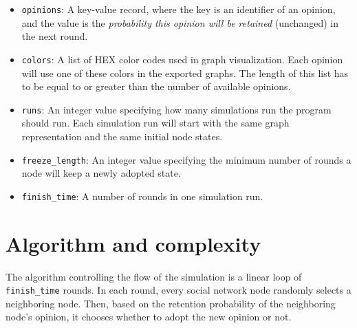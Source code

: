 \documentclass[11pt]{article}
\begin{document}
\begin{itemize}
	\setlength\itemsep{0.2em}

	\item \verb|opinions|: A key-value record, where the key is an identifier of an opinion, and the value is the \emph{probability this opinion will be retained} (unchanged) in the next round.
	\item \verb|colors|: A list of HEX color codes used in graph visualization. Each opinion will use one of these colors in the exported graphs. The length of this list has to be equal to or greater than the number of available opinions.
	\item \verb|runs|: An integer value specifying how many simulations run the program should run. Each simulation run will start with the same graph representation and the same initial node states.
	\item \verb|freeze_length|: An integer value specifying the minimum number of rounds a node will keep a newly adopted state.
	\item \verb|finish_time|: A number of rounds in one simulation run.
\end{itemize}

\section{Algorithm and complexity}
\label{Section:Alg}

The algorithm controlling the flow of the simulation is a linear loop of \verb|finish_time| rounds. In each round, every social network node randomly selects a neighboring node. Then, based on the retention probability of the neighboring node's opinion, it chooses whether to adopt the new opinion or not. 
\end{document}
